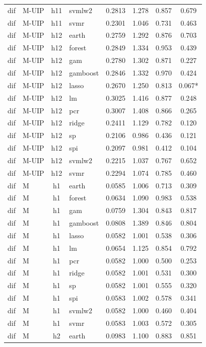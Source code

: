 \begin{ThreePartTable}
\begin{longtable}[t]{llclcccc}
dif & M-UIP & h11 & svmlw2 & 0.2813 & 1.278 & 0.857 & 0.679\\
dif & M-UIP & h11 & svmr & 0.2301 & 1.046 & 0.731 & 0.463\\
\addlinespace
dif & M-UIP & h12 & earth & 0.2759 & 1.292 & 0.876 & 0.703\\
dif & M-UIP & h12 & forest & 0.2849 & 1.334 & 0.953 & 0.439\\
dif & M-UIP & h12 & gam & 0.2780 & 1.302 & 0.871 & 0.227\\
dif & M-UIP & h12 & gamboost & 0.2846 & 1.332 & 0.970 & 0.424\\
dif & M-UIP & h12 & lasso & 0.2670 & 1.250 & 0.813 & 0.067*\\
dif & M-UIP & h12 & lm & 0.3025 & 1.416 & 0.877 & 0.248\\
dif & M-UIP & h12 & pcr & 0.3007 & 1.408 & 0.866 & 0.265\\
dif & M-UIP & h12 & ridge & 0.2411 & 1.129 & 0.782 & 0.120\\
dif & M-UIP & h12 & sp & 0.2106 & 0.986 & 0.436 & 0.121\\
dif & M-UIP & h12 & spi & 0.2097 & 0.981 & 0.412 & 0.104\\
dif & M-UIP & h12 & svmlw2 & 0.2215 & 1.037 & 0.767 & 0.652\\
dif & M-UIP & h12 & svmr & 0.2294 & 1.074 & 0.785 & 0.460\\
\addlinespace
dif & M & h1 & earth & 0.0585 & 1.006 & 0.713 & 0.309\\
dif & M & h1 & forest & 0.0634 & 1.090 & 0.983 & 0.538\\
dif & M & h1 & gam & 0.0759 & 1.304 & 0.843 & 0.817\\
dif & M & h1 & gamboost & 0.0808 & 1.389 & 0.846 & 0.804\\
dif & M & h1 & lasso & 0.0582 & 1.001 & 0.538 & 0.306\\
dif & M & h1 & lm & 0.0654 & 1.125 & 0.854 & 0.792\\
dif & M & h1 & pcr & 0.0582 & 1.000 & 0.500 & 0.253\\
dif & M & h1 & ridge & 0.0582 & 1.001 & 0.531 & 0.300\\
dif & M & h1 & sp & 0.0582 & 1.001 & 0.555 & 0.320\\
dif & M & h1 & spi & 0.0583 & 1.002 & 0.578 & 0.341\\
dif & M & h1 & svmlw2 & 0.0582 & 1.000 & 0.460 & 0.404\\
dif & M & h1 & svmr & 0.0583 & 1.003 & 0.572 & 0.305\\
\addlinespace
dif & M & h2 & earth & 0.0983 & 1.100 & 0.883 & 0.851\\

\end{longtable}
\end{ThreePartTable}
